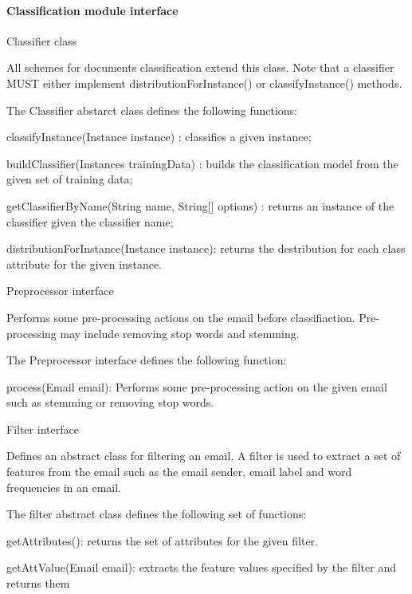 \paragraph{Classification module interface}
\begin{my_itemize}
  \item Classifier class
  \begin{my_desc}
   \item[Purpose] All schemes for documents classification extend this class. Note that a classifier MUST either implement distributionForInstance() or classifyInstance() methods.
   \item[Function] The Classifier abstarct class defines the following functions:
	\begin{my_itemize}
		\item classifyInstance(Instance instance) : classifies a given instance;
		\item buildClassifier(Instances trainingData) : builds the classification model from the given set of training data;
		\item getClassifierByName(String name, String[] options) : returns an instance of the classifier given the classifier name;
		\item distributionForInstance(Instance instance): returns the destribution for each class attribute for the given instance.
	\end{my_itemize}
  \end{my_desc}

  \item Preprocessor interface
  \begin{my_desc}
   \item[Purpose] Performs some pre-processing actions on the email before classifiaction. Pre-processing may include removing stop words and stemming. 
   \item[Function] The Preprocessor interface defines the following function:
	\begin{my_itemize}
	\item process(Email email): Performs some pre-processing action on the given email such as stemming or removing stop words.
	\end{my_itemize}
  \end{my_desc}

  \item Filter interface
  \begin{my_desc}
   \item[Purpose] Defines an abstract class for filtering an email. A filter is used to extract a set of features from the email such as the email sender, email label and word frequencies in an email.
   \item[Function] The filter abstract class defines the following set of functions:
	\begin{my_itemize}
	\item getAttributes(): returns the set of attributes for the given filter.
	\item getAttValue(Email email): extracts the feature values specified by the filter and returns them
	\end{my_itemize}
  \end{my_desc}


\end{my_itemize}
